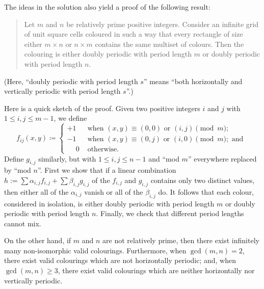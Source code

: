 \documentclass[11pt]{scrartcl}
\begin{document}
\begin{remark*}
The ideas in the solution also yield a proof of the following result:
\begin{quote}
Let $m$ and $n$ be relatively prime positive integers.
Consider an infinite grid of unit square cells coloured in
such a way that every rectangle of size either $m \times n$ or $n \times m$
contains the same multiset of colours.
Then the colouring is either doubly periodic with period length $m$
or doubly periodic with period length $n$.
\end{quote}

(Here, ``doubly periodic with period length $s$''
means ``both horizontally and vertically periodic with period length $s$''.)

Here is a quick sketch of the proof. Given two positive integers $i$ and $j$
with $1 \le i, j \le m - 1$, we define
\[
  f_{ij}(x, y) \coloneqq
  \begin{cases}
    +1 & \text{ when } (x, y) \equiv (0, 0) \text{ or } (i, j) \pmod{m}; \\
    -1 & \text{ when } (x, y) \equiv (0, j) \text{ or } (i, 0) \pmod{m};
      \text{ and } \\
    \phantom{+}0 & \text{ otherwise.}
  \end{cases}
\]
Define $g_{i, j}$ similarly, but with $1 \le i, j \le n - 1$ and ``mod $m$''
everywhere replaced by ``mod $n$''. First we show that if a linear combination
$h := \sum \alpha_{i, j}f_{i, j}+\sum\beta_{i, j}g_{i, j}$ of the $f_{i, j}$ and
$g_{i, j}$ contains only two distinct values, then either all of the $\alpha_{i,
j}$ vanish or all of the $\beta_{i, j}$ do. It follows that each colour,
considered in isolation, is either doubly periodic with period length $m$ or
doubly periodic with period length $n$. Finally, we check that different period
lengths cannot mix.

On the other hand, if $m$ and $n$ are not relatively prime,
then there exist infinitely many non-isomorphic valid colourings.
Furthermore, when $\gcd(m, n) = 2$, there exist valid colourings
which are not horizontally periodic; and, when $\gcd(m, n) \ge 3$,
there exist valid colourings which are neither horizontally nor vertically periodic.
\end{remark*}
\pagebreak
\end{document}
